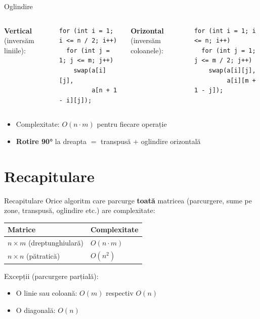 \documentclass{beamer}
\begin{document}
\begin{frame}[fragile]{Oglindire}
  \begin{columns}[T]
    \textbf{Vertical} (inversăm liniile):
    \begin{lstlisting}
for (int i = 1; i <= n / 2; i++)
  for (int j = 1; j <= m; j++)
    swap(a[i][j],
         a[n + 1 - i][j]);
    \end{lstlisting}

    \textbf{Orizontal} (inversăm coloanele):
    \begin{lstlisting}
for (int i = 1; i <= n; i++)
  for (int j = 1; j <= m / 2; j++)
    swap(a[i][j],
         a[i][m + 1 - j]);
    \end{lstlisting}
  \end{columns}

  \smallskip
  \begin{itemize}
    \item Complexitate: $O(n \cdot m)$ pentru fiecare operație
    \item \textbf{Rotire 90°} la dreapta $=$ transpusă $+$ oglindire orizontală
  \end{itemize}
\end{frame}

\section{Recapitulare}

\begin{frame}{Recapitulare}
  Orice algoritm care parcurge \textbf{toată} matricea (parcurgere, sume pe zone, transpusă, oglindire etc.) are complexitate:

  \begin{center}
  \begin{tabular}{ll}
    \toprule
    Matrice & Complexitate \\
    \midrule
    $n \times m$ (dreptunghiulară) & $O(n \cdot m)$ \\
    $n \times n$ (pătratică)       & $O(n^2)$       \\
    \bottomrule
  \end{tabular}
  \end{center}

  \smallskip
  Excepții (parcurgere parțială):
  \begin{itemize}
    \item O linie sau coloană: $O(m)$ respectiv $O(n)$
    \item O diagonală: $O(n)$
  \end{itemize}
\end{frame}
\end{document}

